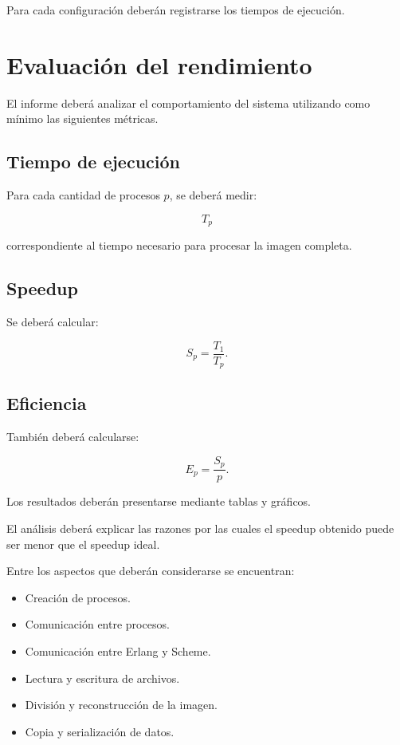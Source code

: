 \documentclass[11pt,a4paper]{article}
\begin{document}
Para cada configuración deberán registrarse los tiempos de ejecución.

\section{Evaluación del rendimiento}

El informe deberá analizar el comportamiento del sistema utilizando
como mínimo las siguientes métricas.

\subsection{Tiempo de ejecución}

Para cada cantidad de procesos $p$, se deberá medir:

$$
T_p
$$

correspondiente al tiempo necesario para procesar la imagen completa.

\subsection{Speedup}

Se deberá calcular:

$$
S_p=\frac{T_1}{T_p}.
$$

\subsection{Eficiencia}

También deberá calcularse:

$$
E_p=\frac{S_p}{p}.
$$

Los resultados deberán presentarse mediante tablas y gráficos.

El análisis deberá explicar las razones por las cuales el speedup
obtenido puede ser menor que el speedup ideal.

Entre los aspectos que deberán considerarse se encuentran:

\begin{itemize}
\item Creación de procesos.
\item Comunicación entre procesos.
\item Comunicación entre Erlang y Scheme.
\item Lectura y escritura de archivos.
\item División y reconstrucción de la imagen.
\item Copia y serialización de datos.
\end{itemize}
\end{document}
